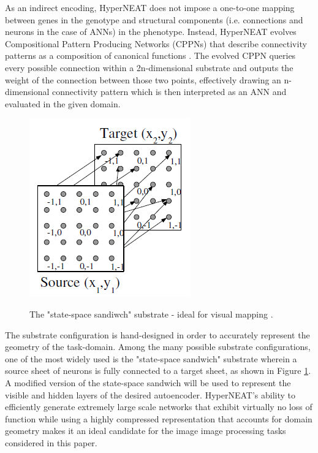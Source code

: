 \documentclass{acm_proc_article-sp}
\begin{document}
As an indirect encoding, HyperNEAT does not impose a one-to-one mapping between genes in the genotype and structural components (i.e. connections and neurons in the case of ANNs) in the phenotype. Instead, HyperNEAT evolves Compositional Pattern Producing Networks (CPPNs) that describe connectivity patterns as a composition of canonical functions \cite{Stanley:2007:CPP:1265496.1265517, Stanley:2009:HEE:1516090.1516093}.  The evolved CPPN queries every possible connection within a 2n-dimensional substrate and outputs the weight of the connection between those two points, effectively drawing an n-dimensional connectivity pattern which is then interpreted as an ANN and evaluated in the given domain.

\begin{figure}[h]
	\caption{The "state-space sandiwch" substrate - ideal for visual mapping \cite{Stanley:2009:HEE:1516090.1516093}.}
	\centering
	\includegraphics[scale=0.8]{StateSpaceSandwichSubstrate}
	\label{figure:examplesubstrate}
\end{figure}

The substrate configuration is hand-designed in order to accurately represent the geometry of the task-domain.  Among the many possible substrate configurations, one of the most widely used is the "state-space sandwich" substrate wherein a source sheet of neurons is fully connected to a target sheet, as shown in Figure \ref{figure:examplesubstrate}.  A modified version of the state-space sandwich will be used to represent the visible and hidden layers of the desired autoencoder.  HyperNEAT's ability to efficiently generate extremely large scale networks that exhibit virtually no loss of function while using a highly compressed representation that accounts for domain geometry makes it an ideal candidate for the image image processing tasks considered in this paper.
\end{document}

